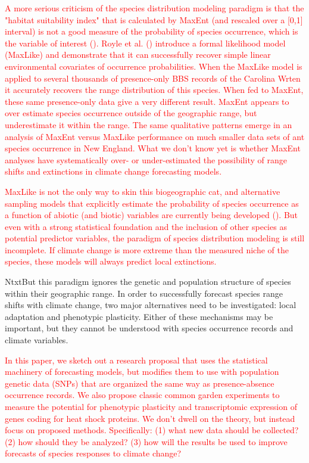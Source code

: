 \documentclass{article}
\newcommand{\Ntxt}[1]{\textcolor{red}{#1}}
\begin{document}
\Ntxt{A more serious criticism of the species distribution modeling paradigm is that the "habitat suitability index" that is calculated by MaxEnt (and rescaled over a [0,1] interval) is not a good measure of the probability of species occurrence, which is the variable of interest (). Royle et al. () introduce a formal likelihood model (MaxLike) and demonstrate that it can successfully recover simple linear environmental covariates of occurrence probabilities. When the MaxLike model is applied to several thousands of presence-only BBS records of the Carolina Wrten it accurately recovers the range distribution of this species. When fed to MaxEnt, these same presence-only data give a very different result. MaxEnt appears to over estimate species occurrence outside of the geographic range, but underestimate it within the range. The same qualitative patterns emerge in an analysis of  MaxEnt versus MaxLike performance on much smaller data sets of ant species occurrence in New England. What we don't know yet is whether MaxEnt analyses have systematically over- or under-estimated the possibility of range shifts and extinctions in climate change forecasting models.}

\Ntxt{MaxLike is not the only way to skin this biogeographic cat, and alternative sampling models that explicitly estimate the probability of species occurrence as a function of abiotic (and biotic) variables are currently being developed (). But even with a strong statistical foundation and the inclusion of other species as potential predictor variables, the paradigm of species distribution modeling is still incomplete. If climate change is more extreme than the measured niche of the species, these models will always predict local extinctions.}

Ntxt{But this paradigm ignores the genetic and population structure of species within their geographic range. In order to successfully forecast species range shifts with climate change, two major alternatives need to be investigated: local adaptation and phenotypic plasticity. Either of these mechanisms may be important, but they cannot be understood with species occurrence records and climate variables.}

\Ntxt{In this paper, we sketch out a research proposal that uses the statistical machinery of forecasting models, but modifies them to use with population genetic data (SNPs) that are organized the same way as presence-absence occurrence records. We also propose classic common garden experiments to measure the potential for phenotypic plasticity and transcriptomic expression of genes coding for heat shock proteins. We don't dwell on the theory, but instead focus on proposed methods. Specifically: (1) what new data should be collected? (2) how should they be analyzed? (3) how will the results be used to improve forecasts of species responses to climate change?}
\end{document}
